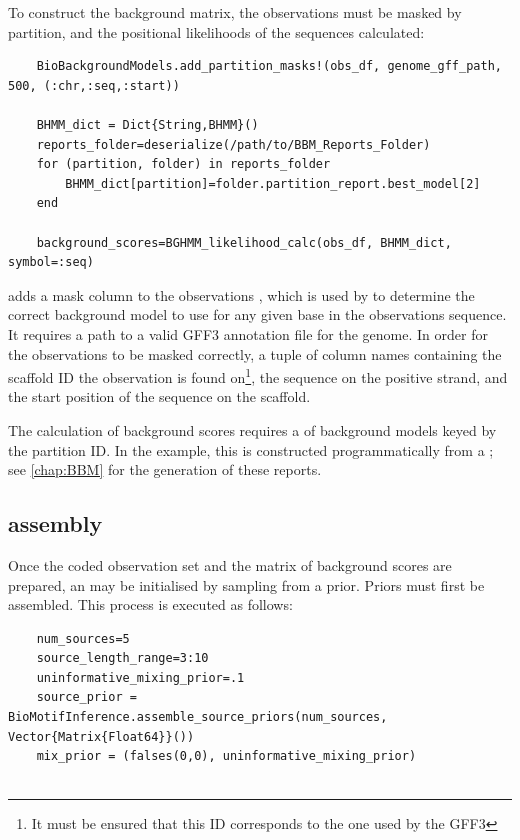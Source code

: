 \documentclass{ut-thesis}
\begin{document}
\begin{NoHyper}
To construct the background matrix, the observations must be masked by partition, and the positional likelihoods of the sequences calculated:

\begin{verbatim}
    BioBackgroundModels.add_partition_masks!(obs_df, genome_gff_path, 500, (:chr,:seq,:start))

    BHMM_dict = Dict{String,BHMM}()
    reports_folder=deserialize(/path/to/BBM_Reports_Folder)
    for (partition, folder) in reports_folder
        BHMM_dict[partition]=folder.partition_report.best_model[2]
    end

    background_scores=BGHMM_likelihood_calc(obs_df, BHMM_dict, symbol=:seq)\end{verbatim}

 adds a mask column to the observations , which is used by  to determine the correct background model to use for any given base in the observations sequence. It requires a path to a valid GFF3 annotation file for the genome. In order for the observations to be masked correctly, a tuple of column names containing the scaffold ID the observation is found on\footnote{It must be ensured that this ID corresponds to the one used by the GFF3}, the sequence on the positive strand, and the start position of the sequence on the scaffold.

The calculation of background scores requires a  of  background models keyed by the partition ID. In the example, this is constructed programmatically from a ; see \autoref{chap:BBM} for the generation of these reports.

\subsection{\protect{} assembly}
Once the coded observation set and the matrix of background scores are prepared, an  may be initialised by sampling from a prior. Priors must first be assembled. This process is executed as follows:

\begin{verbatim}
    num_sources=5
    source_length_range=3:10
    uninformative_mixing_prior=.1
    source_prior = BioMotifInference.assemble_source_priors(num_sources, Vector{Matrix{Float64}}())
    mix_prior = (falses(0,0), uninformative_mixing_prior)


\end{verbatim}
\end{NoHyper}
\end{document}
